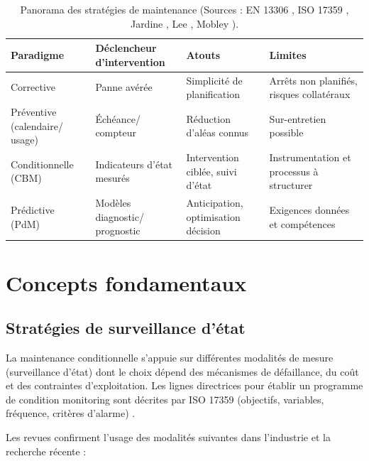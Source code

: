 \begin{table}[ht]
\centering
\caption{Panorama des stratégies de maintenance (Sources : EN 13306 \cite{en13306}, ISO 17359 \cite{iso17359}, Jardine \cite{jardine2006}, Lee \cite{lee2014}, Mobley \cite{mobley2002}).}
\label{tab:maintenance_strategies}
\small
\begin{tabular}{p{2.2cm}p{3.3cm}p{3.8cm}p{3.8cm}}
\toprule
\textbf{Paradigme} & \textbf{Déclencheur d'intervention} & \textbf{Atouts} & \textbf{Limites} \\
\midrule
Corrective & Panne avérée & Simplicité de planification & Arrêts non planifiés, risques collatéraux \\
Préventive (calendaire/ usage) & Échéance/ compteur & Réduction d'aléas connus & Sur-entretien possible \\
Conditionnelle (CBM) & Indicateurs d'état mesurés & Intervention ciblée, suivi d'état & Instrumentation et processus à structurer \\
Prédictive (PdM) & Modèles diagnostic/ prognostic & Anticipation, optimisation décision & Exigences données et compétences \\
\bottomrule
\end{tabular}
\end{table}

\section{Concepts fondamentaux}

\subsection{Stratégies de surveillance d'état}

La maintenance conditionnelle s'appuie sur différentes modalités de mesure (surveillance d'état) dont le choix dépend des mécanismes de défaillance, du coût et des contraintes d'exploitation. Les lignes directrices pour établir un programme de condition monitoring sont décrites par ISO 17359 (objectifs, variables, fréquence, critères d'alarme) \cite{iso17359}.

Les revues confirment l'usage des modalités suivantes dans l'industrie et la recherche récente \cite{tiboni2022,hector2024,achouch2022} :


